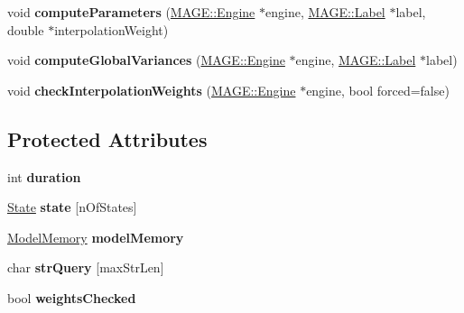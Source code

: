 \begin{DoxyCompactItemize}
\item 
\hypertarget{class_m_a_g_e_1_1_model_a1c14789a6c16843aecddc12886f986b3}{void {\bfseries compute\-Parameters} (\hyperlink{class_m_a_g_e_1_1_engine}{M\-A\-G\-E\-::\-Engine} $\ast$engine, \hyperlink{class_m_a_g_e_1_1_label}{M\-A\-G\-E\-::\-Label} $\ast$label, double $\ast$interpolation\-Weight)}\label{class_m_a_g_e_1_1_model_a1c14789a6c16843aecddc12886f986b3}

\item 
\hypertarget{class_m_a_g_e_1_1_model_adfd98e1d3be9ef4b25a6b544f353f81a}{void {\bfseries compute\-Global\-Variances} (\hyperlink{class_m_a_g_e_1_1_engine}{M\-A\-G\-E\-::\-Engine} $\ast$engine, \hyperlink{class_m_a_g_e_1_1_label}{M\-A\-G\-E\-::\-Label} $\ast$label)}\label{class_m_a_g_e_1_1_model_adfd98e1d3be9ef4b25a6b544f353f81a}

\item 
\hypertarget{class_m_a_g_e_1_1_model_a48c3cee5d400aeba415997b056b2d25e}{void {\bfseries check\-Interpolation\-Weights} (\hyperlink{class_m_a_g_e_1_1_engine}{M\-A\-G\-E\-::\-Engine} $\ast$engine, bool forced=false)}\label{class_m_a_g_e_1_1_model_a48c3cee5d400aeba415997b056b2d25e}

\end{DoxyCompactItemize}
\subsection*{Protected Attributes}
\begin{DoxyCompactItemize}
\item 
\hypertarget{class_m_a_g_e_1_1_model_ab52fc4232cba2bb126f7efed8dff0830}{int {\bfseries duration}}\label{class_m_a_g_e_1_1_model_ab52fc4232cba2bb126f7efed8dff0830}

\item 
\hypertarget{class_m_a_g_e_1_1_model_ac2d75ff326129cf1261b6e90574a1ef4}{\hyperlink{struct_m_a_g_e_1_1_state}{State} {\bfseries state} \mbox{[}n\-Of\-States\mbox{]}}\label{class_m_a_g_e_1_1_model_ac2d75ff326129cf1261b6e90574a1ef4}

\item 
\hypertarget{class_m_a_g_e_1_1_model_a546726e2ff72b89e550fea7fb7a39087}{\hyperlink{class_m_a_g_e_1_1_model_memory}{Model\-Memory} {\bfseries model\-Memory}}\label{class_m_a_g_e_1_1_model_a546726e2ff72b89e550fea7fb7a39087}

\item 
\hypertarget{class_m_a_g_e_1_1_model_a57567f9a8804bc6324dc1797ec7c7ccb}{char {\bfseries str\-Query} \mbox{[}max\-Str\-Len\mbox{]}}\label{class_m_a_g_e_1_1_model_a57567f9a8804bc6324dc1797ec7c7ccb}

\item 
\hypertarget{class_m_a_g_e_1_1_model_a41b96d881c37ec97efe9442043c6011c}{bool {\bfseries weights\-Checked}}\label{class_m_a_g_e_1_1_model_a41b96d881c37ec97efe9442043c6011c}

\end{DoxyCompactItemize}


